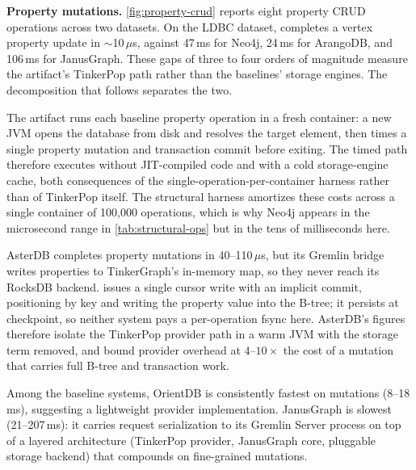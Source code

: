 \textbf{Property mutations.}
\autoref{fig:property-crud} reports eight property CRUD operations across two datasets.
On the LDBC dataset, \project{} completes a vertex property update in ${\sim}$10\,$\mu$s, against 47\,ms for Neo4j, 24\,ms for ArangoDB, and 106\,ms for JanusGraph.
These gaps of three to four orders of magnitude measure the artifact's TinkerPop path rather than the baselines' storage engines.
The decomposition that follows separates the two.

The artifact runs each baseline property operation in a fresh container: a new JVM opens the database from disk and resolves the target element, then times a single property mutation and transaction commit before exiting.
The timed path therefore executes without JIT-compiled code and with a cold storage-engine cache, both consequences of the single-operation-per-container harness rather than of TinkerPop itself.
The structural harness amortizes these costs across a single container of 100{,}000 operations, which is why Neo4j appears in the microsecond range in \autoref{tab:structural-ops} but in the tens of milliseconds here.

AsterDB completes property mutations in 40--110\,$\mu$s, but its Gremlin bridge writes properties to TinkerGraph's in-memory map, so they never reach its RocksDB backend.
\project{} issues a single \wt{} cursor write with an implicit commit, positioning by key and writing the property value into the B-tree; it persists at checkpoint, so neither system pays a per-operation fsync here.
AsterDB's figures therefore isolate the TinkerPop provider path in a warm JVM with the storage term removed, and bound provider overhead at $4$--$10\times$ the cost of a \project{} mutation that carries full B-tree and transaction work.

Among the baseline systems, OrientDB is consistently fastest on mutations (8--18\,ms), suggesting a lightweight provider implementation.
JanusGraph is slowest (21--207\,ms): it carries request serialization to its Gremlin Server process on top of a layered architecture (TinkerPop provider, JanusGraph core, pluggable storage backend) that compounds on fine-grained mutations.

